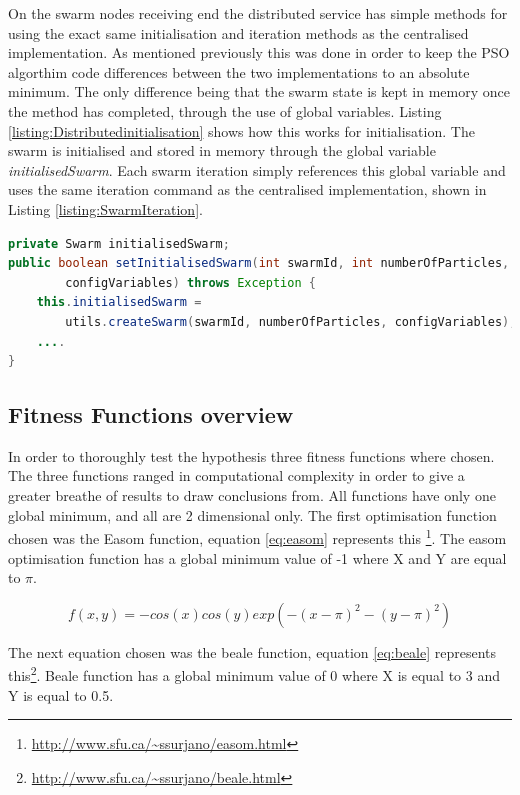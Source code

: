 \documentclass[oneside,12pt]{book}
\begin{document}
On the swarm nodes receiving end the distributed service has simple methods for using the exact same initialisation and iteration methods as the centralised implementation. As mentioned previously this was done in order to keep the PSO algorthim code differences between the two implementations to an absolute minimum. The only difference being that the swarm state is kept in memory once the method has completed, through the use of global variables. Listing \ref{listing:Distributedinitialisation} shows how this works for initialisation. The swarm is initialised and stored in memory through the global variable \textit{initialisedSwarm}. Each swarm iteration simply references this global variable and uses the same iteration command as the centralised implementation, shown in Listing \ref{listing:SwarmIteration}.

\begin{lstlisting}[basicstyle=\footnotesize, language=Java]
private Swarm initialisedSwarm;
public boolean setInitialisedSwarm(int swarmId, int numberOfParticles, ConfigVariables         
        configVariables) throws Exception {
    this.initialisedSwarm = 
        utils.createSwarm(swarmId, numberOfParticles, configVariables);
    ....
}
\end{lstlisting}
\label{listing:Distributedinitialisation}

\subsection{Fitness Functions overview}
In order to thoroughly test the hypothesis three fitness functions where chosen. The three functions ranged in computational complexity in order to give a greater breathe of results to draw conclusions from. All functions have only one global minimum, and all are 2 dimensional only. The first optimisation function chosen was the Easom function, equation \ref{eq:easom} represents this \footnote{\url{http://www.sfu.ca/~ssurjano/easom.html}}. The easom optimisation function has a global minimum value of -1 where X and Y are equal to $\pi$. 

\begin{equation}\label{eq:easom}
f(x,y)=-cos(x)cos(y)exp(-(x-\pi)^2-(y-\pi)^2)
\end{equation}

The next equation chosen was the beale function, equation \ref{eq:beale} represents this\footnote{\url{http://www.sfu.ca/~ssurjano/beale.html}}. Beale function has a global minimum value of 0 where X is equal to 3 and Y is equal to 0.5. 
\end{document}
